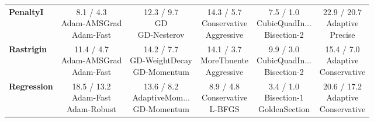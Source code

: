 \documentclass{article}
\begin{document}
\begin{longtable}{lccccc}
\textbf{PenaltyI} &  \makecell{8.1 / 4.3 \\ \scriptsize{Adam-AMSGrad} \\ \scriptsize{Adam-Fast}}&  \makecell{12.3 / 9.7 \\ \scriptsize{GD} \\ \scriptsize{GD-Nesterov}}&  \makecell{14.3 / 5.7 \\ \scriptsize{Conservative} \\ \scriptsize{Aggressive}}& \cellcolor{bestgreen!30} \makecell{7.5 / 1.0 \\ \scriptsize{CubicQuadIn...} \\ \scriptsize{Bisection-2}}& \cellcolor{worstred!20} \makecell{22.9 / 20.7 \\ \scriptsize{Adaptive} \\ \scriptsize{Precise}} \\
\textbf{Rastrigin} &  \makecell{11.4 / 4.7 \\ \scriptsize{Adam-AMSGrad} \\ \scriptsize{Adam-Fast}}&  \makecell{14.2 / 7.7 \\ \scriptsize{GD-WeightDecay} \\ \scriptsize{GD-Momentum}}&  \makecell{14.1 / 3.7 \\ \scriptsize{MoreThuente} \\ \scriptsize{Aggressive}}& \cellcolor{bestgreen!30} \makecell{9.9 / 3.0 \\ \scriptsize{CubicQuadIn...} \\ \scriptsize{Bisection-2}}& \cellcolor{worstred!20} \makecell{15.4 / 7.0 \\ \scriptsize{Adaptive} \\ \scriptsize{Conservative}} \\
\textbf{Regression} &  \makecell{18.5 / 13.2 \\ \scriptsize{Adam-Fast} \\ \scriptsize{Adam-Robust}}&  \makecell{13.6 / 8.2 \\ \scriptsize{AdaptiveMom...} \\ \scriptsize{GD-Momentum}}&  \makecell{8.9 / 4.8 \\ \scriptsize{Conservative} \\ \scriptsize{L-BFGS}}& \cellcolor{bestgreen!30} \makecell{3.4 / 1.0 \\ \scriptsize{Bisection-1} \\ \scriptsize{GoldenSection}}& \cellcolor{worstred!20} \makecell{20.6 / 17.2 \\ \scriptsize{Adaptive} \\ \scriptsize{Conservative}} \\

\end{longtable}
\end{document}
